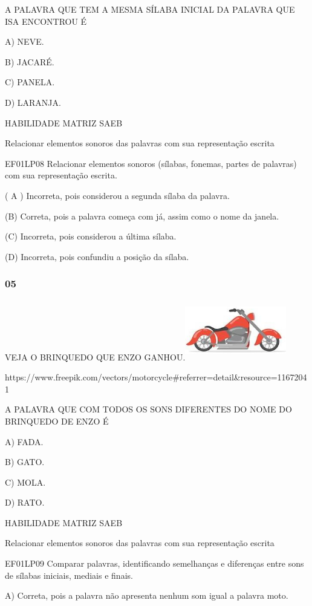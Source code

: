 \begin{escola}
A PALAVRA QUE TEM A MESMA SÍLABA INICIAL DA PALAVRA QUE ISA ENCONTROU É

A) NEVE.

B) JACARÉ.

C) PANELA.

D) LARANJA.

HABILIDADE MATRIZ SAEB

Relacionar elementos sonoros das palavras com sua representação escrita

EF01LP08 Relacionar elementos sonoros (sílabas, fonemas, partes de
palavras) com sua representação escrita.

( A ) Incorreta, pois considerou a segunda sílaba da palavra.

(B) Correta, pois a palavra começa com já, assim como o nome da janela.

(C) Incorreta, pois considerou a última sílaba.

(D) Incorreta, pois confundiu a posição da
sílaba.\protect\hypertarget{_heading=h.33l0sngjt3hj}{}{}

\subsubsection{05}\label{section-77}

VEJA O BRINQUEDO QUE ENZO
GANHOU.\includegraphics[width=1.73681in,height=1.03125in]{media/image245.jpg}

https://www.freepik.com/vectors/motorcycle\#referrer=detail\&resource=11672041

A PALAVRA QUE COM TODOS OS SONS DIFERENTES DO NOME DO BRINQUEDO DE ENZO
É

A) FADA.

B) GATO.

C) MOLA.

D) RATO.

HABILIDADE MATRIZ SAEB

Relacionar elementos sonoros das palavras com sua representação escrita

EF01LP09 Comparar palavras, identificando semelhanças e diferenças entre
sons de sílabas iniciais, mediais e finais.

A) Correta, pois a palavra não apresenta nenhum som igual a palavra
moto.


\end{escola}
